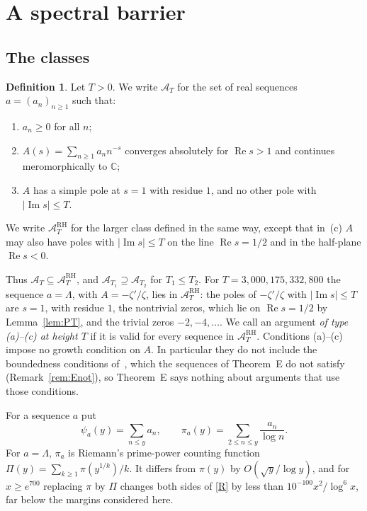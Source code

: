 \documentclass{amsart}
\theoremstyle{definition}
\newtheorem{definition}[theorem]{Definition}
\theoremstyle{remark}
\theoremstyle{plain}
\numberwithin{equation}{section}
\newcommand{\HRH}{3{,}000{,}175{,}332{,}800}
\newcommand{\cA}{\mathcal{A}}
\newcommand{\cARH}{\mathcal{A}^{\mathrm{RH}}}
\begin{document}
\section{A spectral barrier}\label{sec:barrier}

\subsection{The classes}

\begin{definition}\label{def:class}
Let $T>0$. We write $\cA_T$ for the set of real sequences $a=(a_n)_{n\ge1}$ such that:
\begin{enumerate}
\item[(a)] $a_n\ge0$ for all $n$;
\item[(b)] $A(s)=\sum_{n\ge1}a_nn^{-s}$ converges absolutely for $\operatorname{Re}s>1$ and continues meromorphically to $\mathbb C$;
\item[(c)] $A$ has a simple pole at $s=1$ with residue $1$, and no other pole with $|\operatorname{Im}s|\le T$.
\end{enumerate}
We write $\cARH_T$ for the larger class defined in the same way, except that in~(c) $A$ may also have poles with $|\operatorname{Im}s|\le T$ on the line $\operatorname{Re}s=1/2$ and in the half-plane $\operatorname{Re}s<0$.
\end{definition}

Thus $\cA_T\subseteq\cARH_T$, and $\cA_{T_1}\supseteq\cA_{T_2}$ for $T_1\le T_2$. For $T=\HRH$ the sequence $a=\Lambda$, with $A=-\zeta'/\zeta$, lies in $\cARH_T$: the poles of $-\zeta'/\zeta$ with $|\operatorname{Im}s|\le T$ are $s=1$, with residue $1$, the nontrivial zeros, which lie on $\operatorname{Re}s=1/2$ by Lemma~\ref{lem:PT}, and the trivial zeros $-2,-4,\dots$. We call an argument \emph{of type (a)--(c) at height $T$} if it is valid for every sequence in $\cARH_T$. Conditions (a)--(c) impose no growth condition on $A$. In particular they do not include the boundedness conditions of~\cite[Thm.~1.1]{CH25}, which the sequences of Theorem~E do not satisfy (Remark~\ref{rem:Enot}), so Theorem~E says nothing about arguments that use those conditions.

For a sequence $a$ put
\[
\psi_a(y)=\sum_{n\le y}a_n,\qquad \pi_a(y)=\sum_{2\le n\le y}\frac{a_n}{\log n}.
\]
For $a=\Lambda$, $\pi_a$ is Riemann's prime-power counting function $\Pi(y)=\sum_{k\ge1}\pi(y^{1/k})/k$. It differs from $\pi(y)$ by $O(\sqrt y/\log y)$, and for $x\ge e^{700}$ replacing $\pi$ by $\Pi$ changes both sides of \eqref{R} by less than $10^{-100}x^2/\log^6x$, far below the margins considered here.
\end{document}
